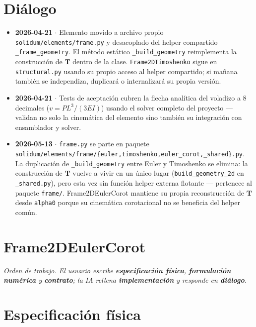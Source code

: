 \documentclass[11pt,letterpaper,oneside]{report}
\begin{document}
\section{Diálogo}

\begin{itemize}
  \item \textbf{2026-04-21} \ensuremath{\cdot} Elemento movido a archivo propio \texttt{solidum/elements/frame.py} y desacoplado del helper compartido \texttt{\_frame\_geometry}. El método estático \texttt{\_build\_geometry} reimplementa la construcción de $\mathbf T$ dentro de la clase. \texttt{Frame2DTimoshenko} sigue en \texttt{structural.py} usando su propio acceso al helper compartido; si mañana también se independiza, duplicará o internalizará su propia versión.
  \item \textbf{2026-04-21} \ensuremath{\cdot} Tests de aceptación cubren la flecha analítica del voladizo a 8 decimales ($v = PL^3/(3EI)$) usando el solver completo del proyecto --- validan no solo la cinemática del elemento sino también su integración con ensamblador y solver.
  \item \textbf{2026-05-13} \ensuremath{\cdot} \texttt{frame.py} se parte en paquete \texttt{solidum/elements/frame/\{euler,timoshenko,euler\_corot,\_shared\}.py}. La duplicación de \texttt{\_build\_geometry} entre Euler y Timoshenko se elimina: la construcción de $\mathbf T$ vuelve a vivir en un único lugar (\texttt{build\_geometry\_2d} en \texttt{\_shared.py}), pero esta vez sin función helper externa flotante --- pertenece al paquete \texttt{frame/}. Frame2DEulerCorot mantiene su propia reconstrucción de $\mathbf T$ desde \texttt{alpha0} porque su cinemática corotacional no se beneficia del helper común.
\end{itemize}


\newpage

\section{Frame2DEulerCorot}



\textit{Orden de trabajo. El usuario escribe \textbf{especificación física}, \textbf{formulación numérica} y \textbf{contrato}; la IA rellena \textbf{implementación} y responde en \textbf{diálogo}.}



\section{Especificación física}
\end{document}
